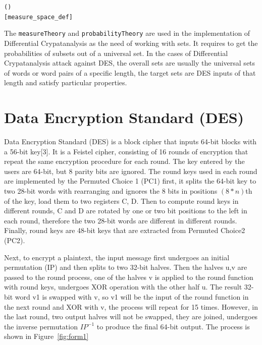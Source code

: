 \documentclass{article}
\begin{document}
\begin{alltt}
\HOLTokenTurnstile{}   \HOLSymConst{\HOLTokenEquiv{}}
    ( ) \HOLSymConst{\HOLTokenConj{}}   \HOLSymConst{\HOLTokenConj{}}
    \hfill{[measure_space_def]}
\end{alltt}

The \verb|measureTheory| and \verb|probabilityTheory| are used in the implementation of Differential Crypatanalysis as the need of working with
sets. It requires to get the probabilities of subsets out of a universal set. In the cases of Differential Crypatanalysis attack against
DES, the overall sets are usually the universal sets of words or word pairs of a specific length, the target sets are DES
inputs of that length and satisfy particular properties.

\section{Data Encryption Standard (DES)}
Data Encryption Standard (DES) is a block cipher that inputs 64-bit blocks with a 56-bit key[3]. It is a Feistel cipher, consisting
of 16 rounds of encryption that repeat the same encryption procedure for each round. The key entered by the users are 64-bit, but 8
parity bits are ignored. The round keys used in each round are implemented
by the Permuted Choice 1 (PC1) first, it splits the 64-bit key to two 28-bit words with rearranging
and ignores the 8 bits in positions $(8*n)$th of the key, load them to two registers C, D. Then to compute round keys
in different rounds, C and D are rotated by
one or two bit positions to the left in each round, therefore the two 28-bit words are different in different rounds. Finally,
round keys are 48-bit keys that are extracted from Permuted Choice2 (PC2).

Next, to encrypt a plaintext, the input message first undergoes
an initial permutation (IP) and then splits to two 32-bit halves. Then the halves u,v are passed to the round process, one of the halves v
is applied to the round function with round keys, undergoes XOR operation with the other half u. The result 32-bit word v1 is swapped with v,
so v1 will be the input of the round function in the next round and XOR with v, the process will repeat for 15 times. However,
in the last round, two output halves will not be swapped, they are joined, undergoes the inverse permutation $IP^{-1}$ to produce
the final 64-bit output. The process is shown in Figure~\ref{fig:form1} 
\end{document}
